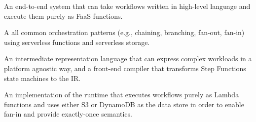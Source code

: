 \squishlist

  \item An end-to-end system that can take workflows written in high-level
  language and execute them purely as FaaS functions.

  \item A 
   all common
  orchestration patterns (e.g., chaining, branching, fan-out, fan-in) using 
  serverless functions and serverless storage.

  \item An intermediate representation language that can express complex
  workloads in a platform agnostic way, and a front-end
  compiler that transforms Step Functions state machines to the IR.

  \item An implementation of the \name{} runtime that executes workflows purely
  as Lambda functions and uses either S3 or DynamoDB as the data store in order to enable
  fan-in and provide exactly-once semantics. 

\squishend

